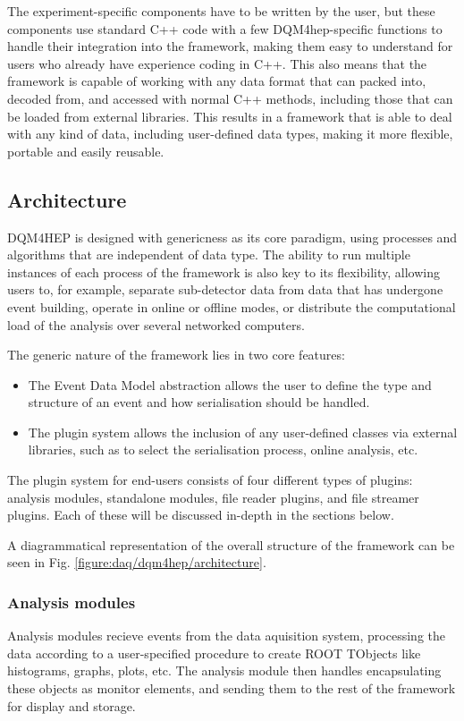 The experiment-specific components have to be written by the user, but these components use standard C++ code with a few DQM4hep-specific functions to handle their integration into the framework, making them easy to understand for users who already have experience coding in C++. This also means that the framework is capable of working with any data format that can packed into, decoded from, and accessed with normal C++ methods, including those that can be loaded from external libraries. This results in a framework that is able to deal with any kind of data, including user-defined data types, making it more flexible, portable and easily reusable.

\subsection{Architecture}
DQM4HEP is designed with genericness as its core paradigm, using processes and algorithms that are independent of data type. The ability to run multiple instances of each process of the framework is also key to its flexibility, allowing users to, for example, separate sub-detector data from data that has undergone event building, operate in online or offline modes, or distribute the computational load of the analysis over several networked computers.

The generic nature of the framework lies in two core features:
\begin{itemize}
	\item The Event Data Model abstraction allows the user to define the type and structure of an event and how serialisation should be handled.
	\item The plugin system allows the inclusion of any user-defined classes via external libraries, such as to select the serialisation process, online analysis, etc.
\end{itemize}

The plugin system for end-users consists of four different types of plugins: analysis modules, standalone modules, file reader plugins, and file streamer plugins. Each of these will be discussed in-depth in the sections below.

A diagrammatical representation of the overall structure of the framework can be seen in Fig. \ref{figure:daq/dqm4hep/architecture}.

\subsubsection{Analysis modules}
Analysis modules recieve events from the data aquisition system, processing the data according to a user-specified procedure to create ROOT TObjects like histograms, graphs, plots, etc. The analysis module then handles encapsulating these objects as monitor elements, and sending them to the rest of the framework for display and storage. 

